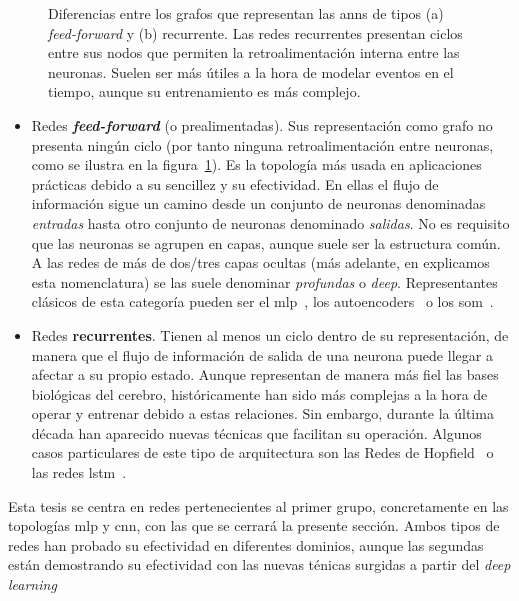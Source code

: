 \begin{figure}[t]
	\centering
	\qquad
	\caption[Diferencias entre redes de tipo \textit{feed-forward} y \textit{recurrente}]{Diferencias entre los grafos que representan las \acp{ann} de tipos (a) \textit{feed-forward} y (b) recurrente. Las redes recurrentes presentan ciclos entre sus nodos que permiten la retroalimentación interna entre las neuronas. Suelen ser más útiles a la hora de modelar eventos en el tiempo, aunque su entrenamiento es más complejo.}
	\label{fig:ff-vs-rnn}
\end{figure}

\begin{itemize}
	\item Redes \textit{\textbf{feed-forward}} (o prealimentadas). Sus representación como grafo no presenta ningún ciclo (por tanto ninguna retroalimentación entre neuronas, como se ilustra en la figura~\ref{fig:ff-vs-rnn}). Es la topología más usada en aplicaciones prácticas debido a su sencillez y su efectividad. En ellas el flujo de información sigue un camino desde un conjunto de neuronas denominadas \textit{entradas} hasta otro conjunto de neuronas denominado \textit{salidas}. No es requisito que las neuronas se agrupen en capas, aunque suele ser la estructura común. A las redes de más de dos/tres capas ocultas (más adelante, en  explicamos esta nomenclatura) se las suele denominar \textit{profundas} o \textit{deep}. Representantes clásicos de esta categoría pueden ser el \gls{mlp}~\cite{rumelhart1985learning}, los \glspl{autoencoder}~\cite{Hinton2006} o los \gls{som}~\cite{kohonen1998self}.
	\item Redes \textbf{recurrentes}. Tienen al menos un ciclo dentro de su representación, de manera que el flujo de información de salida de una neurona puede llegar a afectar a su propio estado. Aunque representan de manera más fiel las bases biológicas del cerebro, históricamente han sido más complejas a la hora de operar y entrenar debido a estas relaciones. Sin embargo, durante la última década han aparecido nuevas técnicas que facilitan su operación. Algunos casos particulares de este tipo de arquitectura son las Redes de Hopfield~\cite{hopfield1982neural} o las redes \Acrfull{lstm}~\cite{hochreiter1997long}.
\end{itemize}

Esta tesis se centra en redes pertenecientes al primer grupo, concretamente en las topologías \acrshort{mlp} y \acrshort{cnn}, con las que se cerrará la presente sección. Ambos tipos de redes han probado su efectividad en diferentes dominios, aunque las segundas están demostrando su efectividad con las nuevas ténicas surgidas a partir del \textit{deep learning}

